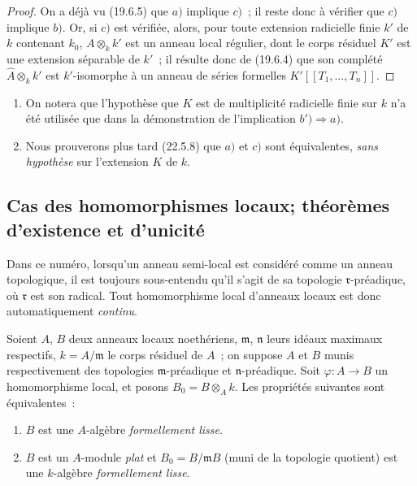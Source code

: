 \begin{proof}
On a déjà vu (19.6.5) que $a)$ implique $c)$~; il reste donc à vérifier que
$c)$ implique $b)$. Or, si $c)$ est vérifiée, alors, pour toute extension
radicielle finie $k'$ de $k$ contenant $k_0$, $A\otimes_k k'$ est un anneau
local régulier, dont le corps résiduel $K'$ est une extension séparable de
$k'$~; il résulte donc de (19.6.4) que son complété
$\widehat A\otimes_k k'$ est $k'$-isomorphe à un anneau de séries formelles
$K'[[T_1,\ldots,T_n]]$.
\end{proof}

\begin{remarks}[19.6.7]
\label{0.19.6.7-fr}
\begin{enumerate}
  \item[\rm(i)] On notera que l'hypothèse que $K$ est de multiplicité
  radicielle finie sur $k$ n'a été utilisée que dans la démonstration de
  l'implication $b')\Rightarrow a)$.
  \item[\rm(ii)] Nous prouverons plus tard (22.5.8) que $a)$ et $c)$ sont
  équivalentes, \emph{sans hypothèse} sur l'extension $K$ de $k$.
\end{enumerate}
\end{remarks}

\subsection{Cas des homomorphismes locaux; théorèmes d'existence et
d'unicité}
\label{subsection:0.19.7-fr}

Dans ce numéro, lorsqu'un anneau semi-local est considéré comme un anneau
topologique, il est toujours sous-entendu qu'il s'agit de sa topologie
$\mathfrak r$-préadique, où $\mathfrak r$ est son radical. Tout homomorphisme
local d'anneaux locaux est donc automatiquement \emph{continu}.

\begin{theorem}[19.7.1]
\label{0.19.7.1-fr}
Soient $A$, $B$ deux anneaux locaux noethériens, $\mathfrak m$, $\mathfrak n$
leurs idéaux maximaux respectifs, $k=A/\mathfrak m$ le corps résiduel de $A$~;
on suppose $A$ et $B$ munis respectivement des topologies
$\mathfrak m$-préadique et $\mathfrak n$-préadique. Soit
$\varphi:A\to B$ un homomorphisme local, et posons $B_0=B\otimes_A k$.
Les propriétés suivantes sont équivalentes~:
\begin{enumerate}
  \item[a)] $B$ est une $A$-algèbre \emph{formellement lisse}.


  \item[b)] $B$ est un $A$-module \emph{plat} et
  $B_0=B/\mathfrak mB$ (muni de la topologie quotient) est une $k$-algèbre
  \emph{formellement lisse}.
\end{enumerate}
\end{theorem}

